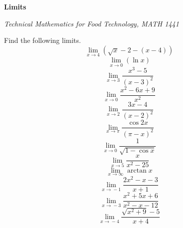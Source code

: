 \documentclass[11pt]{article}
\newcommand{\CourseName}{Technical Mathematics for Food Technology}
\newcommand{\CourseNumber}{1441}
\newcommand{\CourseName}{Technical Mathematics for Geomatics}
\newcommand{\CourseNumber}{1511}
\begin{document}
\textbf{Limits}

\emph{\CourseName, MATH \CourseNumber}

Find the following limits.
\begin{equation}
  \label{eq:voiqueez}
  \lim_{x\rightarrow{}4}(\sqrt{x}-2-(x-4))
\end{equation}
\begin{equation}
  \label{eq:eiwainge}
  \lim_{x\rightarrow{}0}\left(\ln{}x\right)
\end{equation}
\begin{equation}
  \label{eq:wixaetae}
  \lim_{x\rightarrow{}3}\frac{x^{3}-5}{(x-3)^{2}}
\end{equation}
\begin{equation}
  \label{eq:axiengie}
  \lim_{x\rightarrow{}0}\frac{x^{2}-6x+9}{x^{2}}
\end{equation}
\begin{equation}
  \label{eq:eichokei}
  \lim_{x\rightarrow{}2}\frac{3x-4}{(x-2)^{2}}
\end{equation}
\begin{equation}
  \label{eq:xujaekah}
  \lim_{x\rightarrow{}\pi}\frac{\cos{}2x}{(\pi-x)^{2}}
\end{equation}
\begin{equation}
  \label{eq:ahphucaj}
  \lim_{x\rightarrow{}0}\frac{1}{\sqrt{1-\cos{}x}}
\end{equation}
\begin{equation}
  \label{eq:ieriepoh}
  \lim_{x\rightarrow{}5}\frac{x}{x^{2}-25}
\end{equation}
\begin{equation}
  \label{eq:ceekohto}
  \lim_{x\rightarrow{}\infty}\arctan{}x
\end{equation}
\begin{equation}
  \label{eq:waengohn}
  \lim_{x\rightarrow{}-1}\frac{2x^{2}-x-3}{x+1}
\end{equation}
\begin{equation}
  \label{eq:aiceiphu}
  \lim_{x\rightarrow{}-3}\frac{x^{2}+5x+6}{x^{2}-x-12}
\end{equation}
\begin{equation}
  \label{eq:iidooziu}
  \lim_{x\rightarrow{}-4}\frac{\sqrt{x^{2}+9}-5}{x+4}
\end{equation}

\end{document}
